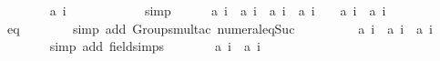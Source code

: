 \begin{isabellebody}
\ \ \ \ \ \ \isamarkupfalse%
\ {\isacharbackquoteopen}{\isacharquery}a\ {\isacharparenleft}i\ {\isacharplus}\ {}{\isacharparenright}\ {\isachargreater}\ {}{\isacharbackquoteclose}\isanewline
\ \ \ \ \ \ \isamarkupfalse%
\ simp\isanewline
\isanewline
\ \ \ \ \isamarkupfalse%
\ {\isachardoublequoteopen}{\isacharquery}a\ {\isacharparenleft}i{\isacharplus}{}{\isacharparenright}\ {\isacharminus}\ {\isacharquery}a\ {\isacharparenleft}i{\isacharplus}{}{\isacharparenright}\ {\isacharequal}\ {\isacharparenleft}{\isacharquery}a\ {\isacharparenleft}i{\isacharplus}{}{\isacharparenright}\ {\isacharasterisk}\ {\isacharquery}a\ {\isacharparenleft}i{\isacharplus}{}{\isacharparenright}\ {\isacharplus}\ {}{\isacharparenright}\ {\isacharminus}\ {\isacharparenleft}{\isacharquery}a\ {\isacharparenleft}i{\isacharplus}{}{\isacharparenright}\ {\isacharasterisk}\ {\isacharquery}a\ {\isacharparenleft}i{\isacharplus}{}{\isacharparenright}\ {\isacharplus}\ {}{\isacharparenright}{\isachardoublequoteclose}\isanewline
\ \ \ \ \ \ \isamarkupfalse%
\ eq\isanewline
\ \ \ \ \ \ \isamarkupfalse%
\ {\isacharparenleft}simp\ add{\isacharcolon}\ Groups{\isachardot}mult{\isacharunderscore}ac{\isacharparenleft}{}{\isacharparenright}\ numeral{\isacharunderscore}eq{\isacharunderscore}Suc{\isacharparenright}\isanewline
\ \ \ \ \isamarkupfalse%
\ \isamarkupfalse%
\ {\isachardoublequoteopen}{\isachardot}{\isachardot}{\isachardot}\ {\isacharequal}\ {\isacharquery}a\ {\isacharparenleft}i{\isacharplus}{}{\isacharparenright}\ {\isacharasterisk}\ {\isacharparenleft}{\isacharquery}a\ {\isacharparenleft}i{\isacharplus}{}{\isacharparenright}\ {\isacharminus}\ {\isacharquery}a\ {\isacharparenleft}i{\isacharplus}{}{\isacharparenright}{\isacharparenright}{\isachardoublequoteclose}\isanewline
\ \ \ \ \ \ \isamarkupfalse%
\ {\isacharparenleft}simp\ add{\isacharcolon}\ field{\isacharunderscore}simps{\isacharparenright}\isanewline
\ \ \ \ \isamarkupfalse%
\ \isamarkupfalse%
\ {\isachardoublequoteopen}{\isacharquery}a\ {\isacharparenleft}i{\isacharplus}{}{\isacharparenright}\ {\isacharminus}\ {\isacharquery}a\ {\isacharparenleft}i{\isacharplus}{}{\isacharparenright}\ {\isachargreater}\ {}{\isachardoublequoteclose}\isanewline
\ \ \ \ \ \ \isamarkupfalse%

\end{isabellebody}
